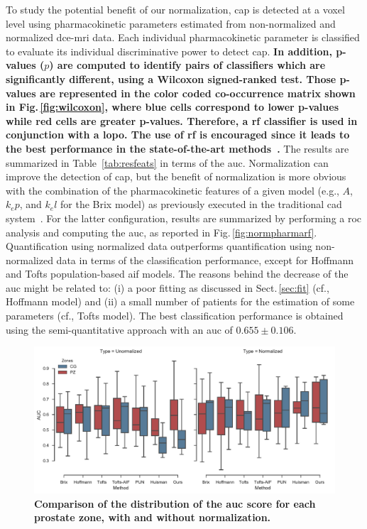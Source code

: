 To study the potential benefit of our normalization, \ac{cap} is detected at a voxel level using pharmacokinetic parameters estimated from non-normalized and normalized \ac{dce}-\ac{mri} data.
Each individual pharmacokinetic parameter is classified to evaluate its individual discriminative power to detect \ac{cap}.
\textbf{In addition, p-values ($p$) are computed to identify pairs of classifiers
which are significantly different, using a Wilcoxon signed-ranked
test. Those p-values are represented in the color coded co-occurrence
matrix shown in Fig.\,\ref{fig:wilcoxon}, where blue cells correspond
to lower p-values while red cells are greater p-values.
Therefore, a \ac{rf} classifier is used in conjunction with a \ac{lopo}.
The use of \ac{rf} is encouraged since it leads to the best performance in the state-of-the-art methods~\citep{litjens2014computer,lemaitre2015computer}.}
The results are summarized in Table~\ref{tab:resfeats} in terms of the \ac{auc}.
Normalization can improve the detection of \ac{cap}, but the benefit
of normalization is more obvious with the combination of the
pharmacokinetic features of a given model (e.g., $A$, $k_ep$, and
$k_el$ for the Brix model) as previously executed in the traditional \ac{cad} system~\citep{lemaitre2015computer}.
For the latter configuration, results are summarized by performing a \ac{roc} analysis and computing the \ac{auc}, as reported in Fig.\,\ref{fig:normpharmarf}.
Quantification using normalized data outperforms quantification using
non-normalized data in terms of the classification performance, except
for Hoffmann and Tofts population-based \ac{aif} models.
The reasons behind the decrease of the \ac{auc} might be related to:
(i) a poor fitting as discussed in Sect.\,\ref{sec:fit} (cf., Hoffmann
model) and (ii) a small number of patients for the estimation of some parameters (cf., Tofts model).
The best classification performance is obtained using the
semi-quantitative approach with an \ac{auc} of $0.655 \pm 0.106$.


\begin{figure}
  \centering
  \includegraphics[width=1.\linewidth]{03_experiments/figures/plot_auc_by_zones.pdf}
  \caption{\textbf{Comparison of the distribution of the \acs*{auc} score for
    each prostate zone, with and without normalization.}}
  \label{fig:boxplot}
\end{figure}

